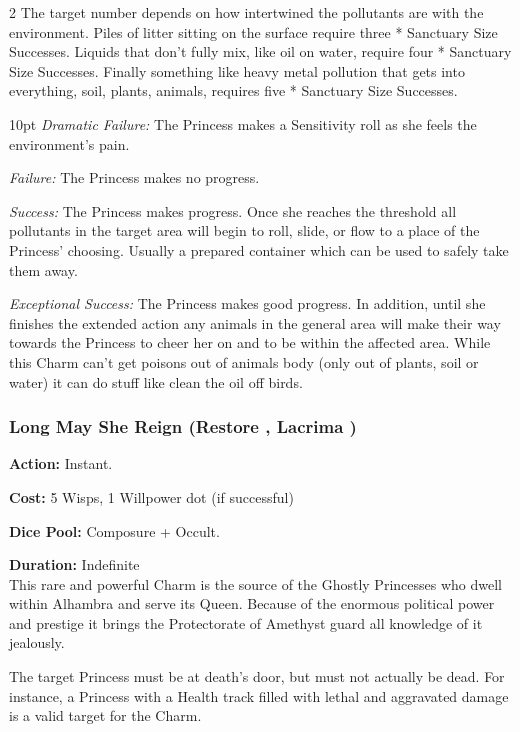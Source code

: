 \begin{multicols}{2}
The target number depends on how intertwined the pollutants are with the environment. Piles of litter sitting on the surface require three * Sanctuary Size Successes. Liquids that don't fully mix, like oil on water, require four * Sanctuary Size Successes. Finally something like heavy metal pollution that gets into everything, soil, plants, animals, requires five * Sanctuary Size Successes. 

\begin{myindentpar}{10pt}    \emph{Dramatic Failure:} The Princess makes a Sensitivity roll as she feels the environment's pain. 

    \emph{Failure:} The Princess makes no progress. 
    
    \emph{Success:} The Princess makes progress. Once she reaches the threshold all pollutants in the target area will begin to roll, slide, or flow to a place of the Princess' choosing. Usually a prepared container which can be used to safely take them away. 
    
    \emph{Exceptional Success:} The Princess makes good progress. In addition, until she finishes the extended action any animals in the general area will make their way towards the Princess to cheer her on and to be within the affected area. While this Charm can't get poisons out of animals body (only out of plants, soil or water) it can do stuff like clean the oil off birds.\end{myindentpar}

\subsubsection*{Long May She Reign (Restore \textbullet\textbullet\textbullet\textbullet\textbullet, Lacrima \textbullet\textbullet\textbullet\textbullet\textbullet)}

\noindent \textbf{Action:} Instant. 

\noindent \textbf{Cost:} 5 Wisps, 1 Willpower dot (if successful)

\noindent \textbf{Dice Pool:} Composure + Occult.

\noindent \textbf{Duration:} Indefinite \\

\noindent This rare and powerful Charm is the source of the Ghostly Princesses who dwell within Alhambra and serve its Queen. Because of the enormous political power and prestige it brings the Protectorate of Amethyst guard all knowledge of it jealously.

The target Princess must be at death's door, but must not actually be dead. For instance, a Princess with a Health track filled with lethal and aggravated damage is a valid target for the Charm.


\end{multicols}
